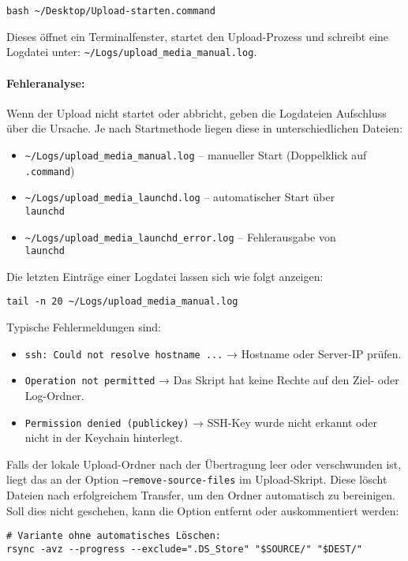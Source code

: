 \documentclass[12pt,a4paper]{report}
\begin{document}
    \begin{verbatim}
bash ~/Desktop/Upload-starten.command
    \end{verbatim}

    Dieses öffnet ein Terminalfenster, startet den Upload-Prozess und schreibt eine Logdatei unter:
    \texttt{\textasciitilde/Logs/upload\_media\_manual.log}.

    \paragraph{Fehleranalyse:}
    Wenn der Upload nicht startet oder abbricht, geben die Logdateien Aufschluss über die Ursache.  
    Je nach Startmethode liegen diese in unterschiedlichen Dateien:
    \begin{itemize}
      \item \texttt{\textasciitilde/Logs/upload\_media\_manual.log} – manueller Start (Doppelklick auf \texttt{.command})
      \item \texttt{\textasciitilde/Logs/upload\_media\_launchd.log} – automatischer Start über\\ \texttt{launchd}
      \item \texttt{\textasciitilde/Logs/upload\_media\_launchd\_error.log} – Fehlerausgabe von\\ \texttt{launchd}
    \end{itemize}

    Die letzten Einträge einer Logdatei lassen sich wie folgt anzeigen:
    \begin{verbatim}
tail -n 20 ~/Logs/upload_media_manual.log
    \end{verbatim}

    Typische Fehlermeldungen sind:
    \begin{itemize}
      \item \texttt{ssh: Could not resolve hostname ...} → Hostname oder Server-IP prüfen.
      \item \texttt{Operation not permitted} → Das Skript hat keine Rechte auf den Ziel- oder Log-Ordner.
      \item \texttt{Permission denied (publickey)} → SSH-Key wurde nicht erkannt oder nicht in der Keychain hinterlegt.
    \end{itemize}

    Falls der lokale Upload-Ordner nach der Übertragung leer oder verschwunden ist, liegt das an der Option \texttt{--remove-source-files} im Upload-Skript.  
    Diese löscht Dateien nach erfolgreichem Transfer, um den Ordner automatisch zu bereinigen.  
    Soll dies nicht geschehen, kann die Option entfernt oder auskommentiert werden:
    \begin{verbatim}
# Variante ohne automatisches Löschen:
rsync -avz --progress --exclude=".DS_Store" "$SOURCE/" "$DEST/"
    \end{verbatim}
\end{document}
